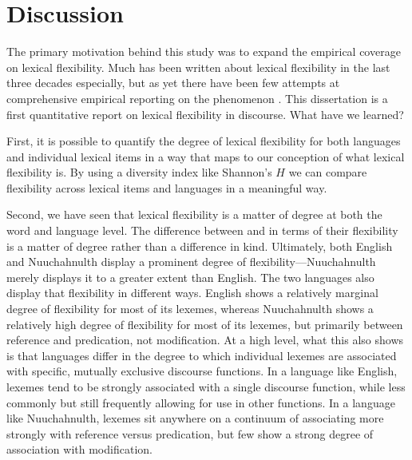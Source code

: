 \section{Discussion}
\label{sec:5.3}

The primary motivation behind this study was to expand the empirical coverage on lexical flexibility. Much has been written about lexical flexibility in the last three decades especially, but as yet there have been few attempts at comprehensive empirical reporting on the phenomenon . This dissertation is a first quantitative report on lexical flexibility in discourse. What have we learned?

First, it is possible to quantify the degree of lexical flexibility for both languages and individual lexical items in a way that maps to our conception of what lexical flexibility is. By using a diversity index like Shannon's $H$ we can compare flexibility across lexical items and languages in a meaningful way.

Second, we have seen that lexical flexibility is a matter of degree at both the word and language level. The difference between  and  in terms of their flexibility is a matter of degree rather than a difference in kind. Ultimately, both English and Nuuchahnulth display a prominent degree of flexibility—Nuuchahnulth merely displays it to a greater extent than English. The two languages also display that flexibility in different ways. English shows a relatively marginal degree of flexibility for most of its lexemes, whereas Nuuchahnulth shows a relatively high degree of flexibility for most of its lexemes, but primarily between reference and predication, not modification. At a high level, what this also shows is that languages differ in the degree to which individual lexemes are associated with specific, mutually exclusive discourse functions. In a language like English, lexemes tend to be strongly associated with a single discourse function, while less commonly but still frequently allowing for use in other functions. In a language like Nuuchahnulth, lexemes sit anywhere on a continuum of associating more strongly with reference versus predication, but few show a strong degree of association with modification.

